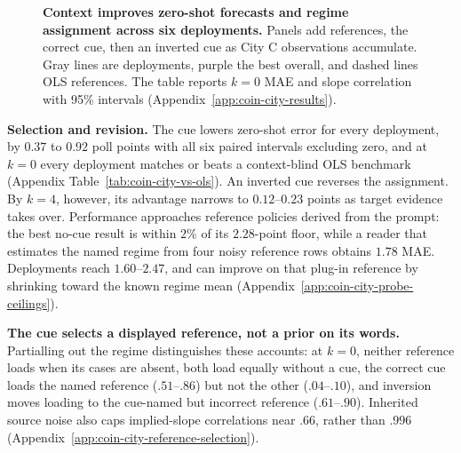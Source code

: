 \begin{figure}[!ht]
\begin{minipage}{\linewidth}
{\begin{tabular}{l r rrrr rr}
\bottomrule
\end{tabular}
}
\end{minipage}
\caption{\textbf{Context improves zero-shot forecasts and regime assignment across
six deployments.} Panels add references, the correct cue, then an inverted cue
as City C observations accumulate. Gray lines are deployments, purple the best
overall, and dashed lines OLS references. The table reports $k=0$ MAE and slope
correlation with 95\% intervals (Appendix~\ref{app:coin-city-results}).}
\label{fig:coin-city-results}
\vspace{10pt}
\end{figure}

\textbf{Selection and revision.} The cue lowers zero-shot error for every
deployment, by $0.37$ to $0.92$ poll points with all six paired intervals
excluding zero, and at $k=0$ every deployment matches or beats a context-blind
OLS benchmark (Appendix Table~\ref{tab:coin-city-vs-ols}). An inverted cue
reverses the assignment. By $k=4$, however, its advantage narrows to
$0.12$--$0.23$ points as target evidence takes over. Performance approaches reference policies derived from the prompt: the best no-cue
result is within $2\%$ of its $2.28$-point floor, while a reader that estimates the
named regime from four noisy reference rows obtains $1.78$ MAE. Deployments reach
$1.60$--$2.47$, and can improve on that plug-in reference by shrinking toward the
known regime mean (Appendix~\ref{app:coin-city-probe-ceilings}).

\textbf{The cue selects a displayed reference, not a prior on its words.}
Partialling out the regime distinguishes these accounts: at $k=0$, neither
reference loads when its cases are absent, both load equally without a cue, the
correct cue loads the named reference ($.51$--$.86$) but not the other
($.04$--$.10$), and inversion moves loading to the cue-named but incorrect reference
($.61$--$.90$). Inherited source noise also caps implied-slope correlations near
$.66$, rather than $.996$ (Appendix~\ref{app:coin-city-reference-selection}).

